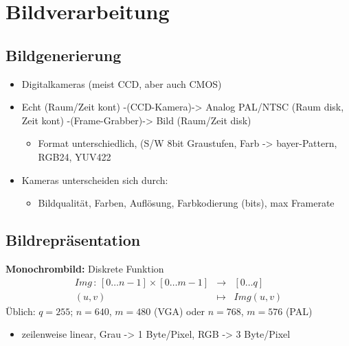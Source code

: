 
\newcommand{\myfbox}[1]{
\begin{tabular}{|l|}
\hline #1 \\ \hline
\end{tabular}
}

\chapter{Bildverarbeitung}

\section{Bildgenerierung}

\begin{itemize}
\item Digitalkameras (meist CCD, aber auch CMOS)
\item Echt (Raum/Zeit kont) -(CCD-Kamera)-> Analog PAL/NTSC (Raum disk, Zeit kont) -(Frame-Grabber)-> Bild (Raum/Zeit disk)
\begin{itemize}
\item Format unterschiedlich, (S/W 8bit Graustufen, Farb -> bayer-Pattern, RGB24, YUV422
\end{itemize}
\item Kameras unterscheiden sich durch:
\begin{itemize}
\item Bildqualität, Farben, Auflösung, Farbkodierung (bits), max Framerate
\end{itemize}
\end{itemize}

\section{Bildrepräsentation}

\textbf{Monochrombild:} Diskrete Funktion
\begin{eqnarray*}
Img \, : \, [0 \dots n-1] \times [0 \dots m-1] &\to& [0 \dots q] \\ (u,v) &\mapsto& Img(u,v)
\end{eqnarray*}
Üblich: $q = 255$; $n = 640$, $m=480$ (VGA) oder $n = 768$, $m=576$ (PAL) \\[0,1cm]
\begin{itemize}
\item zeilenweise linear, Grau -> 1 Byte/Pixel, RGB -> 3 Byte/Pixel
\end{itemize}

